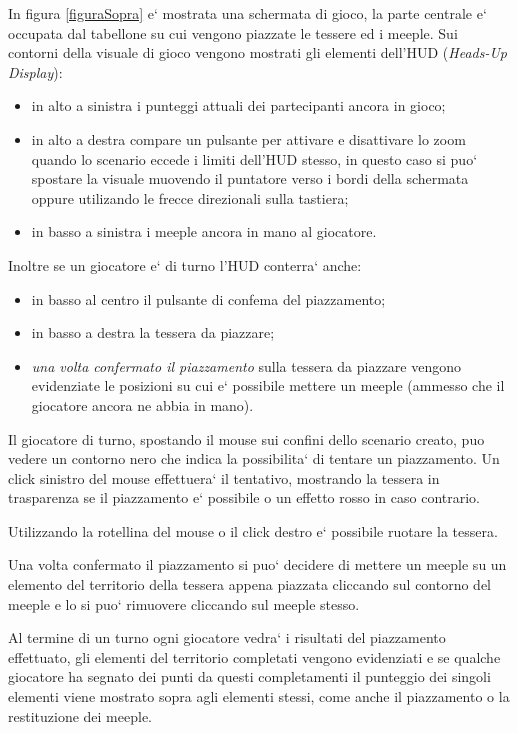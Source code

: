 In figura \ref{figuraSopra} e` mostrata una schermata di gioco, la parte centrale e` occupata dal tabellone su cui vengono piazzate le tessere ed i meeple. 
Sui contorni della visuale di gioco vengono mostrati gli elementi dell'HUD (\emph{Heads-Up Display}): 
\begin{itemize}
\item in alto a sinistra i punteggi attuali dei partecipanti ancora in gioco;
\item in alto a destra compare un pulsante per attivare e disattivare lo zoom quando lo scenario eccede i limiti dell'HUD stesso, in questo caso si puo` spostare la visuale muovendo il puntatore verso i bordi della schermata oppure utilizando le frecce direzionali sulla tastiera;
\item in basso a sinistra i meeple ancora in mano al giocatore.
\end{itemize}
Inoltre se un giocatore e` di turno l'HUD conterra` anche:
\begin{itemize}
\item in basso al centro il pulsante di confema del piazzamento;
\item in basso a destra la tessera da piazzare;
\item \emph{una volta confermato il piazzamento} sulla tessera da piazzare vengono evidenziate le posizioni su cui e` possibile mettere un meeple (ammesso che il giocatore ancora ne abbia in mano).
\end{itemize}

Il giocatore di turno, spostando il mouse sui confini dello scenario creato, puo vedere un contorno nero che indica la possibilita` di tentare un piazzamento. Un click sinistro del mouse effettuera` il tentativo, mostrando la tessera in trasparenza se il piazzamento e` possibile o un effetto rosso in caso contrario. 

Utilizzando la rotellina del mouse o il click destro e` possibile ruotare la tessera.

Una volta confermato il piazzamento si puo` decidere di mettere un meeple su un elemento del territorio della tessera appena piazzata cliccando sul contorno del meeple e lo si puo` rimuovere cliccando sul meeple stesso.

Al termine di un turno ogni giocatore vedra` i risultati del piazzamento effettuato, gli elementi del territorio completati vengono evidenziati e se qualche giocatore ha segnato dei punti da questi completamenti il punteggio dei singoli elementi viene mostrato sopra agli elementi stessi, come anche il piazzamento o la restituzione dei meeple.

